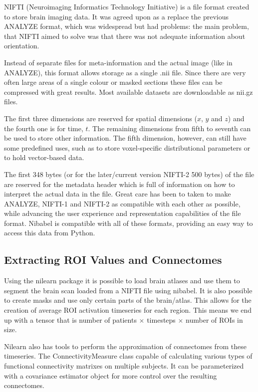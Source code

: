 	NIFTI (Neuroimaging Informatics Technology Initiative) is a file format created to store brain imaging data\cite{nifti}. It was agreed upon as a replace the previous ANALYZE format, which was widespread but had problems: the main problem, that NIFTI aimed to solve was that there was not adequate information about orientation.
	
	Instead of separate files for meta-information and the actual image (like in ANALYZE), this format allows storage as a single .nii file. Since there are very often large areas of a single colour or masked sections these files can be compressed with great results. Most available datasets are downloadable as nii.gz files.
	
	The first three dimensions are reserved for spatial dimensions ($x$, $y$ and $z$) and the fourth one is for time, $t$. The remaining dimensions from fifth to seventh can be used to store other information. The fifth dimension, however, can still have some predefined uses, such as to store voxel-specific distributional parameters or to hold vector-based data. 
	
	The first 348 bytes (or for the later/current version NIFTI-2 500 bytes) of the file are reserved for the metadata header which is full of information on how to interpret the actual data in the file. Great care has been to taken to make ANALYZE, NIFTI-1 and NIFTI-2 as compatible with each other as possible, while advancing the user experience and representation capabilities of the file format. Nibabel is compatible with all of these formats, providing an easy way to access this data from Python.
	
	
	\subsection{Extracting ROI Values and Connectomes}
	\label{sec:extract}
	
	Using the nilearn package it is possible to load brain atlases and use them to segment the brain scan loaded from a NIFTI file using nibabel. It is also possible to create masks and use only certain parts of the brain/atlas. This allows for the creation of average ROI activation timeseries for each region. This means we end up with a tensor that is number of patients $\times$ timesteps $\times$ number of ROIs in size.
	
	Nilearn also has tools to perform the approximation of connectomes from these timeseries. The ConnectivityMeasure class capable of calculating various types of functional connectivity matrixes on multiple subjects. It can be parameterized with a covariance estimator object for more control over the resulting connectomes.
	
